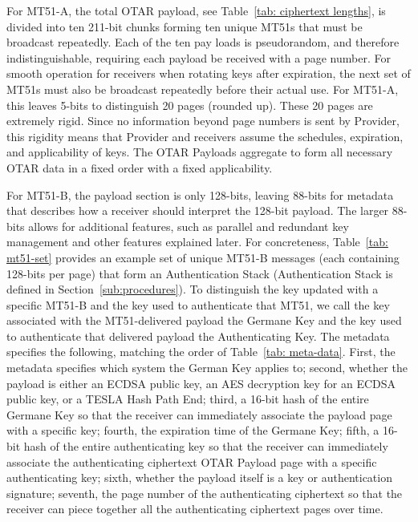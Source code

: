 \documentclass[letterpaper,times]{IONconf/IONconf}
\begin{document}
		For MT51-A, the total OTAR payload, see Table~\ref{tab: ciphertext lengths}, is divided into ten 211-bit chunks forming ten unique MT51s that must be broadcast repeatedly.
		Each of the ten pay loads is pseudorandom, and therefore indistinguishable, requiring each payload be received with a page number.
		For smooth operation for receivers when rotating keys after expiration, the next set of MT51s must also be broadcast repeatedly before their actual use.
		For MT51-A, this leaves 5-bits to distinguish 20 pages (rounded up).
		These 20 pages are extremely rigid.
		Since no information beyond page numbers is sent by Provider, this rigidity means that Provider and receivers assume the schedules, expiration, and applicability of keys.
		The OTAR Payloads aggregate to form all necessary OTAR data in a fixed order with a fixed applicability.
		
		For MT51-B, the payload section is only 128-bits, leaving 88-bits for metadata that describes how a receiver should interpret the 128-bit payload.
		The larger 88-bits allows for additional features, such as parallel and redundant key management and other features explained later.
		For concreteness, Table~\ref{tab: mt51-set} provides an example set of unique MT51-B messages (each containing 128-bits per page) that form an Authentication Stack (Authentication Stack is defined in Section~\ref{sub:procedures}).
		To distinguish the key updated with a specific MT51-B and the key used to authenticate that MT51, we call the key associated with the MT51-delivered payload the Germane Key and the key used to authenticate that delivered payload the Authenticating Key.
		The metadata specifies the following, matching the order of Table~\ref{tab: meta-data}.
		First, the metadata specifies which system the German Key applies to;
		second, whether the payload is either an ECDSA public key, an AES decryption key for an ECDSA public key, or a TESLA Hash Path End;
		third, a 16-bit hash of the entire Germane Key so that the receiver can immediately associate the payload page with a specific key;
		fourth, the expiration time of the Germane Key;
		fifth, a 16-bit hash of the entire authenticating key so that the receiver can immediately associate the authenticating ciphertext OTAR Payload page with a specific authenticating key;
		sixth, whether the payload itself is a key or authentication signature;
		seventh, the page number of the authenticating ciphertext so that the receiver can piece together all the authenticating ciphertext pages over time.
\end{document}
